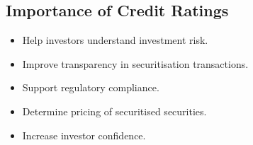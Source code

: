 \vspace{0.6cm}

\subsection*{Importance of Credit Ratings}

\begin{itemize}
	
	\item Help investors understand investment risk.
	
	\item Improve transparency in securitisation transactions.
	
	\item Support regulatory compliance.
	
	\item Determine pricing of securitised securities.
	
	\item Increase investor confidence.
	
\end{itemize}